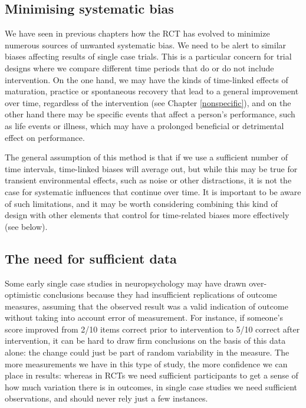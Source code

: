\documentclass{krantz}
\begin{document}
\hypertarget{minimising-systematic-bias}{%
\subsection{Minimising systematic bias}\label{minimising-systematic-bias}}

We have seen in previous chapters how the RCT has evolved to minimize numerous sources of unwanted systematic bias. We need to be alert to similar biases affecting results of single case trials. This is a particular concern for trial designs where we compare different time periods that do or do not include intervention. On the one hand, we may have the kinds of time-linked effects of maturation, practice or spontaneous recovery that lead to a general improvement over time, regardless of the intervention (see Chapter \ref{nonspecific}), and on the other hand there may be specific events that affect a person's performance, such as life events or illness, which may have a prolonged beneficial or detrimental effect on performance.

The general assumption of this method is that if we use a sufficient number of time intervals, time-linked biases will average out, but while this may be true for transient environmental effects, such as noise or other distractions, it is not the case for systematic influences that continue over time. It is important to be aware of such limitations, and it may be worth considering combining this kind of design with other elements that control for time-related biases more effectively (see below).

\hypertarget{the-need-for-sufficient-data}{%
\subsection{The need for sufficient data}\label{the-need-for-sufficient-data}}

Some early single case studies in neuropsychology may have drawn over-optimistic conclusions because they had insufficient replications of outcome measures, assuming that the observed result was a valid indication of outcome without taking into account error of measurement. For instance, if someone's score improved from 2/10 items correct prior to intervention to 5/10 correct after intervention, it can be hard to draw firm conclusions on the basis of this data alone: the change could just be part of random variability in the measure. The more measurements we have in this type of study, the more confidence we can place in results: whereas in RCTs we need sufficient participants to get a sense of how much variation there is in outcomes, in single case studies we need sufficient observations, and should never rely just a few instances.
\end{document}
